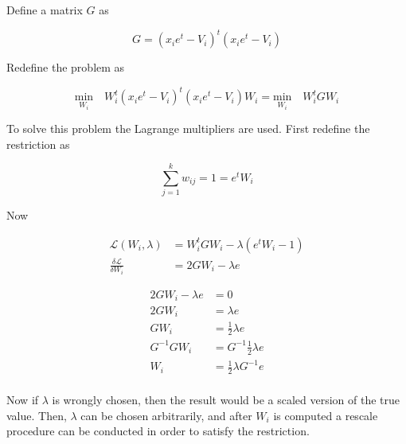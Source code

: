 \documentclass[12pt,journal]{IEEEtran}
\begin{document}
    Define a matrix $G$ as

    \begin{equation*}
        G = (x_i e^t - V_i)^t (x_i e^t - V_i)
    \end{equation*}

    Redefine the problem as

    \begin{equation*}
            \underset{W_i}{\text{min}} \quad W_i^t(x_i e^t - V_i)^t (x_i e^t - V_i) W_i
            =
            \underset{W_i}{\text{min}} \quad W_i^t G W_i
    \end{equation*}

    To solve this problem the Lagrange multipliers are used. First redefine the
    restriction as

    \begin{equation*}
        \sum_{j=1}^k w_{ij} = 1 = e^t W_i
    \end{equation*}

    Now

    \begin{equation*}
        \begin{aligned}
            \mathcal{L}(W_i, \lambda) &= W_i^t G W_i - \lambda (e^t W_i - 1)\\
            \frac{\delta \mathcal{L}}{\delta W_i} &= 2 G W_i - \lambda e
        \end{aligned}
    \end{equation*}

    \begin{equation*}
        \begin{aligned}
            2 G W_i - \lambda e &= 0 \\
            2 G W_i &= \lambda e \\
            G W_i &= \frac{1}{2} \lambda e \\
            G^{-1} G W_i &= G^{-1} \frac{1}{2} \lambda e \\
            W_i &= \frac{1}{2} \lambda G^{-1} e \\
        \end{aligned}
    \end{equation*}

    Now if $\lambda$ is wrongly chosen, then the result would be a scaled version
    of the true value. Then, $\lambda$ can be chosen arbitrarily, and after $W_i$
    is computed a rescale procedure can be conducted in order to satisfy the
    restriction.\\
\end{document}
